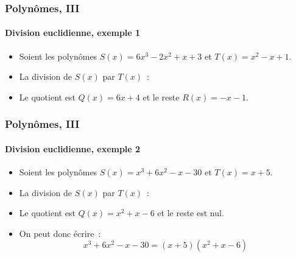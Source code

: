 \documentclass[10pt,notheorems]{beamer}
\theoremstyle{plain}
\theoremstyle{definition} %
\begin{document}
\begin{frame}
  \frametitle{Polynômes, III}
  \framesubtitle{Division euclidienne, exemple 1}
  \hypertarget{slide_division_exemple_1}{}

  \begin{itemize}

  \item Soient les polynômes $S(x) = 6x^3-2x^2+x+3$ et $T(x) = x^2-x+1$.\newline

  \item La division de $S(x)$ par $T(x)$~:\newline

    \begin{Center}
    \end{Center}

    \bigskip

  \item Le quotient est $Q(x) = 6x+4$ et le reste $R(x) = -x-1$.

  \end{itemize}

\end{frame}


\begin{frame}
  \frametitle{Polynômes, III}
  \framesubtitle{Division euclidienne, exemple 2}
  \hypertarget{slide_division_exemple_2}{}

  \bigskip

  \begin{itemize}

  \item Soient les polynômes $S(x) = x^3+6x^2-x-30$ et $T(x) = x+5$.\newline

  \item La division de $S(x)$ par $T(x)$~:\newline

    \begin{Center}
    \end{Center}

    \bigskip

  \item Le quotient est $Q(x) = x^2+x-6$ et le reste est nul.\newline

  \item On peut donc écrire~:
    \[
      x^3+6x^2-x-30 = (x+5)(x^2+x-6)
    \]

  \end{itemize}

\end{frame}
\end{document}
